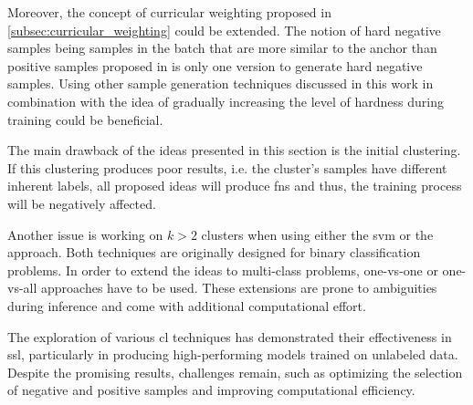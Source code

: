 Moreover, the concept of curricular weighting proposed in \autoref{subsec:curricular_weighting} could be extended.
The notion of hard negative samples being samples in the batch that are more similar to the anchor than positive samples 
proposed in \citet{curricular_weighting_2024} is only one version to generate hard negative samples.
Using other sample generation techniques discussed in this work in combination with 
the idea of gradually increasing the level of hardness during training could be beneficial.

The main drawback of the ideas presented in this section is the initial clustering.
If this clustering produces poor results, i.e. the cluster's samples have different inherent labels, 
all proposed ideas will produce \acp{fn} and thus, the training process will be negatively affected.

Another issue is working on $k>2$ clusters when using either the \ac{svm} or the \fisher{} approach.
Both techniques are originally designed for binary classification problems.
In order to extend the ideas to multi-class problems, one-vs-one or one-vs-all approaches have to be used. 
These extensions are prone to ambiguities during inference and 
come with additional computational effort.

The exploration of various \ac{cl} techniques has demonstrated their effectiveness in \ac{ssl}, 
particularly in producing high-performing models trained on unlabeled data. 
Despite the promising results, challenges remain, such as optimizing the selection of negative and positive samples 
and improving computational efficiency.